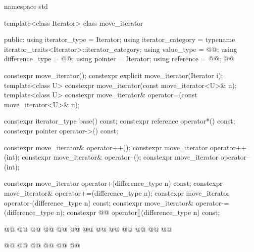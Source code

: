 %
\begin{codeblock}
namespace std {
  template<class Iterator>
  class move_iterator {
  public:
    using iterator_type     = Iterator;
    using iterator_category = typename iterator_traits<Iterator>::iterator_category;
    using value_type        = @@;
    using difference_type   = @@;
    using pointer           = Iterator;
    using reference         = @@;
    @@

    constexpr move_iterator();
    constexpr explicit move_iterator(Iterator i);
    template<class U> constexpr move_iterator(const move_iterator<U>& u);
    template<class U> constexpr move_iterator& operator=(const move_iterator<U>& u);

    constexpr iterator_type base() const;
    constexpr reference operator*() const;
    constexpr pointer operator->() const;

    constexpr move_iterator& operator++();
    constexpr move_iterator operator++(int);
    constexpr move_iterator& operator--();
    constexpr move_iterator operator--(int);

    constexpr move_iterator operator+(difference_type n) const;
    constexpr move_iterator& operator+=(difference_type n);
    constexpr move_iterator operator-(difference_type n) const;
    constexpr move_iterator& operator-=(difference_type n);
    constexpr @@ operator[](difference_type n) const;

    @@
    @@
      @@
        @@
    @@
      @@
        @@
    @@
      @@
        @@
    @@
      @@
        @@

    @@
      @@
        @@
    @@
      @@
        @@

}}
\end{codeblock}
